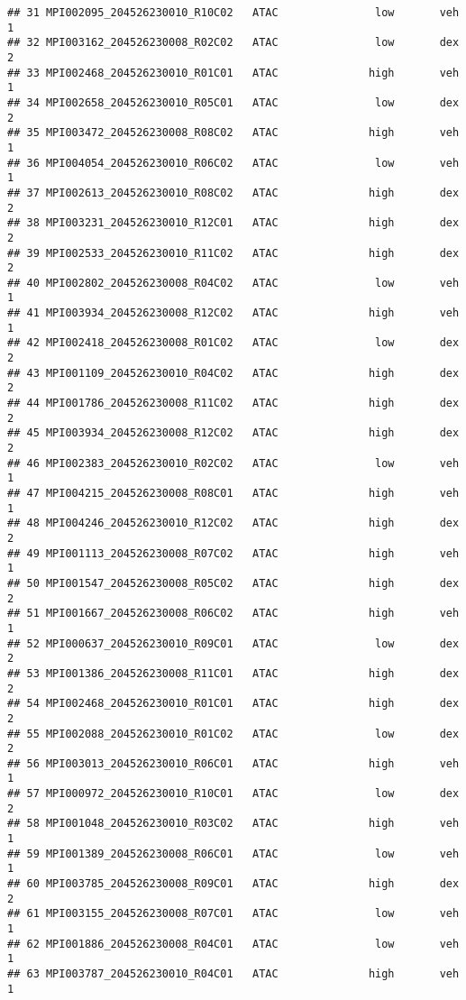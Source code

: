 \documentclass[
]{article}
\begin{document}
\begin{verbatim}
## 31 MPI002095_204526230010_R10C02   ATAC               low       veh         1
## 32 MPI003162_204526230008_R02C02   ATAC               low       dex         2
## 33 MPI002468_204526230010_R01C01   ATAC              high       veh         1
## 34 MPI002658_204526230010_R05C01   ATAC               low       dex         2
## 35 MPI003472_204526230008_R08C02   ATAC              high       veh         1
## 36 MPI004054_204526230010_R06C02   ATAC               low       veh         1
## 37 MPI002613_204526230010_R08C02   ATAC              high       dex         2
## 38 MPI003231_204526230010_R12C01   ATAC              high       dex         2
## 39 MPI002533_204526230010_R11C02   ATAC              high       dex         2
## 40 MPI002802_204526230008_R04C02   ATAC               low       veh         1
## 41 MPI003934_204526230008_R12C02   ATAC              high       veh         1
## 42 MPI002418_204526230008_R01C02   ATAC               low       dex         2
## 43 MPI001109_204526230010_R04C02   ATAC              high       dex         2
## 44 MPI001786_204526230008_R11C02   ATAC              high       dex         2
## 45 MPI003934_204526230008_R12C02   ATAC              high       dex         2
## 46 MPI002383_204526230010_R02C02   ATAC               low       veh         1
## 47 MPI004215_204526230008_R08C01   ATAC              high       veh         1
## 48 MPI004246_204526230010_R12C02   ATAC              high       dex         2
## 49 MPI001113_204526230008_R07C02   ATAC              high       veh         1
## 50 MPI001547_204526230008_R05C02   ATAC              high       dex         2
## 51 MPI001667_204526230008_R06C02   ATAC              high       veh         1
## 52 MPI000637_204526230010_R09C01   ATAC               low       dex         2
## 53 MPI001386_204526230008_R11C01   ATAC              high       dex         2
## 54 MPI002468_204526230010_R01C01   ATAC              high       dex         2
## 55 MPI002088_204526230010_R01C02   ATAC               low       dex         2
## 56 MPI003013_204526230010_R06C01   ATAC              high       veh         1
## 57 MPI000972_204526230010_R10C01   ATAC               low       dex         2
## 58 MPI001048_204526230010_R03C02   ATAC              high       veh         1
## 59 MPI001389_204526230008_R06C01   ATAC               low       veh         1
## 60 MPI003785_204526230008_R09C01   ATAC              high       dex         2
## 61 MPI003155_204526230008_R07C01   ATAC               low       veh         1
## 62 MPI001886_204526230008_R04C01   ATAC               low       veh         1
## 63 MPI003787_204526230010_R04C01   ATAC              high       veh         1

\end{verbatim}
\end{document}
